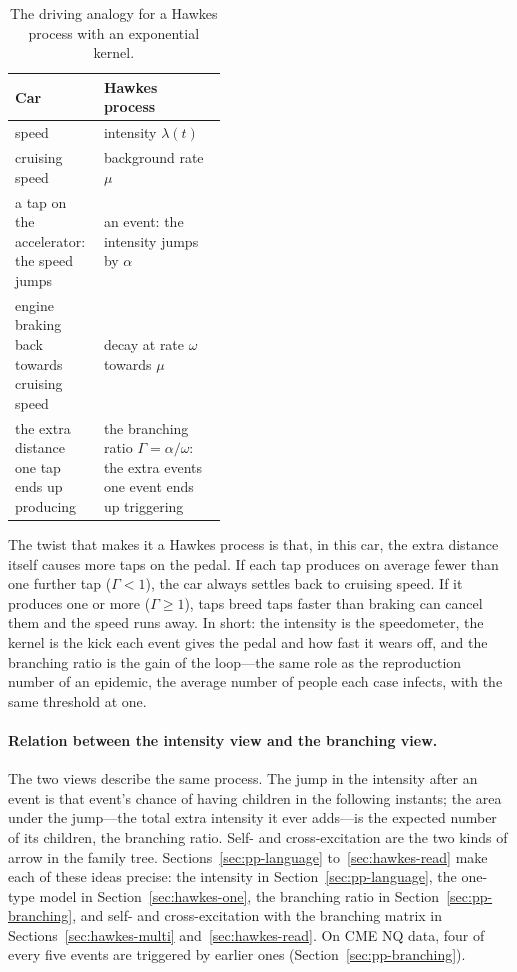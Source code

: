 \begin{table}[!htbp]
\centering\footnotesize
\caption{The driving analogy for a Hawkes process with an exponential kernel.}
\label{tab:car}
\begin{tabularx}{\linewidth}{>{\raggedright\arraybackslash}p{0.42\linewidth}>{\raggedright\arraybackslash}X}
\toprule
Car & Hawkes process \\
\midrule
speed & intensity $\lambda(t)$ \\
cruising speed & background rate $\mu$ \\
a tap on the accelerator: the speed jumps & an event: the intensity jumps by $\alpha$ \\
engine braking back towards cruising speed & decay at rate $\omega$ towards $\mu$ \\
the extra distance one tap ends up producing & the branching ratio $\Gamma = \alpha/\omega$: the extra events one event ends up triggering \\
\bottomrule
\end{tabularx}
\end{table}

The twist that makes it a Hawkes process is that, in this car, the extra distance itself causes more taps on the
pedal. If each tap produces on average fewer than one further tap ($\Gamma < 1$), the car always settles back to
cruising speed. If it produces one or more ($\Gamma \ge 1$), taps breed taps faster than braking can cancel them and
the speed runs away. In short: the intensity is the speedometer, the kernel is the kick each event gives the pedal
and how fast it wears off, and the branching ratio is the gain of the loop---the same role as the reproduction number
of an epidemic, the average number of people each case infects, with the same threshold at one.

\paragraph{Relation between the intensity view and the branching view.} The two views describe the same process. The jump in the intensity after
an event is that event's chance of having children in the following instants; the area under the jump---the
total extra intensity it ever adds---is the expected number of its children, the branching ratio. Self- and
cross-excitation are the two kinds of arrow in the family tree. Sections~\ref{sec:pp-language}
to~\ref{sec:hawkes-read} make each of these ideas precise: the intensity in Section~\ref{sec:pp-language}, the
one-type model in Section~\ref{sec:hawkes-one}, the branching ratio in Section~\ref{sec:pp-branching}, and
self- and cross-excitation with the branching matrix in Sections~\ref{sec:hawkes-multi}
and~\ref{sec:hawkes-read}. On CME NQ data, four of every five events are triggered by earlier ones
(Section~\ref{sec:pp-branching}).

